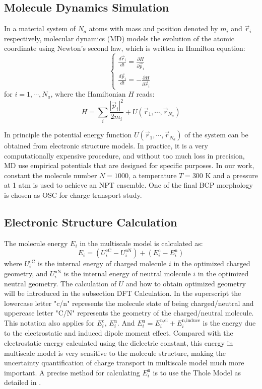 \documentclass[letterpaper,12pt]{article}
\begin{document}
\subsection{Molecule Dynamics Simulation}
In a material system of $N_a$ atoms with mass and position denoted by $m_i$ and $\vec{r}_i$ respectively, molecular dynamics (MD) models the evolution of the atomic coordinate using Newton's second law, which is written in Hamilton equation: 
\begin{equation}
    \begin{cases}
        \frac{d \vec{r}_i}{dt} = \frac{\partial H }{\partial \vec{p}_i} \\
        \frac{d \vec{p}_i}{dt} = -\frac{\partial H }{\partial \vec{r}_i}
    \end{cases}
    \label{eq:Hamilton}
\end{equation}
for $i=1,\cdots,N_a$, where the Hamiltonian $H$ reads:
\begin{equation}
    H=\sum\limits_{i} \frac{|\vec{p}_i|^2}{2 m_i} + U(\vec{r}_1,\cdots,\vec{r}_{N_a})
    \label{eq:Hamilton2}
\end{equation} 

In principle the potential energy function $U(\vec{r}_1,\cdots,\vec{r}_{N_a})$ of the system can be obtained from electronic structure models. In practice, it is a very computationally expensive procedure, and without too much loss in precision, MD use empirical potentials that are designed for specific purposes.
In our work, constant the molecule number $N=1000$, a temperature $T=300$ K and a pressure at 1 atm is used to achieve an NPT ensemble. 
One of the final BCP morphology is chosen as OSC for charge transport study. 

\subsection{Electronic Structure Calculation} 
The molecule energy $E_i$ in the multiscale model is calculated as:
\begin{equation}
E_i = (U^\text{cC}_i - U^\text{nN}_i) + (E^\text{c}_i - E^\text{n}_i)
\label{eq:E_i}
\end{equation}
where $U^\text{cC}_i$ is the internal energy of charged molecule $i$ in the optimized charged geometry, and $U^\text{nN}_i$ is the internal energy of neutral molecule $i$ in the optimized neutral geometry. The calculation of $U$ and how to obtain optimized geometry will be introduced in the subsection DFT Calculation.
In the superscript the lowercase letter "c/n" represents the molecule state of being charged/neutral and uppercase letter "C/N" represents the geometry of the charged/neutral molecule. This notation also applies for $E^\text{c}_i$, $E^\text{n}_i$. 
And $E^\text{n}_i = E^\text{n,el}_i + E^\text{n,induce}_i$ is the energy due to the electrostatic and induced dipole moment effect. Compared with the electrostatic energy calculated using the dielectric constant, this energy in multiscale model is very sensitive to the molecule structure, making the uncertainty quantification of charge transport in multiscale model much more important. 
A precise method for calculating $E^\text{n}_i$ is to use the Thole Model as detailed in \cite{Baumeier2011}.
\end{document}
